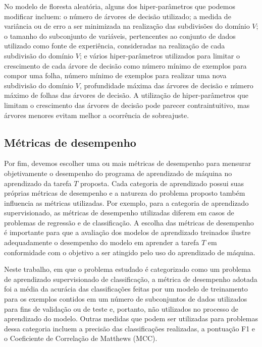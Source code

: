 No modelo de floresta aleatória, alguns dos hiper-parâmetros que podemos modificar incluem: o número de árvores de decisão utilizado; a medida de variância ou de erro a ser minimizada na realização das subdivisões do domínio $V$; o tamanho do subconjunto de variáveis, pertencentes ao conjunto de dados utilizado como fonte de experiência, consideradas na realização de cada subdivisão do domínio $V$; e vários hiper-parâmetros utilizados para limitar o crescimento de cada árvore de decisão como número mínimo de exemplos para compor uma folha, número mínimo de exemplos para realizar uma nova subdivisão do domínio $V$, profundidade máxima das árvores de decisão e número máximo de folhas das árvores de decisão. A utilização de hiper-parâmetros que limitam o crescimento das árvores de decisão pode parecer contraintuitivo, mas árvores menores evitam melhor a ocorrência de sobreajuste.\cite[p.307]{statistical_learning}

\subsection{Métricas de desempenho}

Por fim, devemos escolher uma ou mais métricas de desempenho para mensurar objetivamente o desempenho do programa de aprendizado de máquina no aprendizado da tarefa $T$ proposta. Cada categoria de aprendizado possui suas próprias métricas de desempenho e a natureza do problema proposto também influencia as métricas utilizadas. Por exemplo, para a categoria de aprendizado supervisionado, as métricas de desempenho utilizadas diferem em casos de problemas de regressão e de classificação. A escolha das métricas de desempenho é importante para que a avaliação dos modelos de aprendizado treinados ilustre adequadamente o desempenho do modelo em aprender a tarefa $T$ em conformidade com o objetivo a ser atingido pelo uso do aprendizado de máquina.

Neste trabalho, em que o problema estudado é categorizado como um problema de aprendizado supervisionado de classificação, a métrica de desempenho adotada foi a média da acurácia das classificações feitas por um modelo de treinamento para os exemplos contidos em um número de subconjuntos de dados utilizados para fins de validação ou de teste e, portanto, não utilizados no processo de aprendizado do modelo. Outras medidas que podem ser utilizadas para problemas dessa categoria incluem a precisão das classificações realizadas, a pontuação F1 e o Coeficiente de Correlação de Matthews (MCC).

